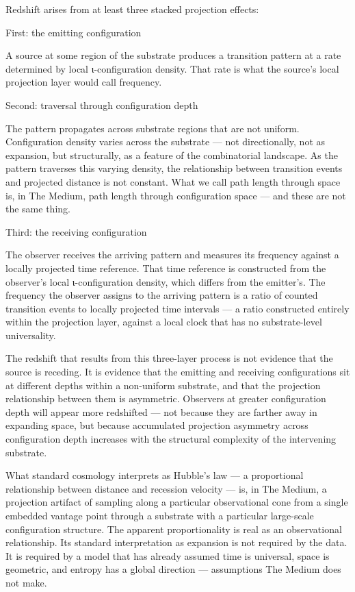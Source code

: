 \documentclass[11pt,letterpaper]{article}
\begin{document}
Redshift arises from at least three stacked projection effects:

First: the emitting configuration

A source at some region of the substrate produces a transition pattern at a rate determined by local ι-configuration density. That rate is what the source's local projection layer would call frequency.

Second: traversal through configuration depth

The pattern propagates across substrate regions that are not uniform. Configuration density varies across the substrate — not directionally, not as expansion, but structurally, as a feature of the combinatorial landscape. As the pattern traverses this varying density, the relationship between transition events and projected distance is not constant. What we call path length through space is, in The Medium, path length through configuration space — and these are not the same thing.

Third: the receiving configuration

The observer receives the arriving pattern and measures its frequency against a locally projected time reference. That time reference is constructed from the observer's local ι-configuration density, which differs from the emitter's. The frequency the observer assigns to the arriving pattern is a ratio of counted transition events to locally projected time intervals — a ratio constructed entirely within the projection layer, against a local clock that has no substrate-level universality.

The redshift that results from this three-layer process is not evidence that the source is receding. It is evidence that the emitting and receiving configurations sit at different depths within a non-uniform substrate, and that the projection relationship between them is asymmetric. Observers at greater configuration depth will appear more redshifted — not because they are farther away in expanding space, but because accumulated projection asymmetry across configuration depth increases with the structural complexity of the intervening substrate.

What standard cosmology interprets as Hubble's law — a proportional relationship between distance and recession velocity — is, in The Medium, a projection artifact of sampling along a particular observational cone from a single embedded vantage point through a substrate with a particular large-scale configuration structure. The apparent proportionality is real as an observational relationship. Its standard interpretation as expansion is not required by the data. It is required by a model that has already assumed time is universal, space is geometric, and entropy has a global direction — assumptions The Medium does not make.
\end{document}
